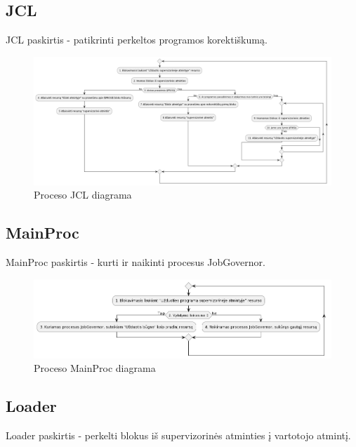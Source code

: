 \documentclass{VUMIFInfKursinis}
\begin{document}
\subsection{JCL}

JCL paskirtis - patikrinti perkeltos programos korektiškumą.

\begin{figure}[H]
	\centering	
	\includegraphics[scale=0.3]{img/JCL}
	\caption{Proceso JCL diagrama}   %
	\label{img:JCL}
\end{figure}

\subsection{MainProc}

MainProc paskirtis - kurti ir naikinti procesus JobGovernor.

\begin{figure}[H]
	\centering	
	\includegraphics[scale=0.40]{img/MainProc}
	\caption{Proceso MainProc diagrama}   %
	\label{img:MainProc}
\end{figure}

\subsection{Loader}

Loader paskirtis - perkelti blokus iš supervizorinės atminties į vartotojo atmintį.
\end{document}
